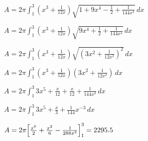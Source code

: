 \documentclass[../main.tex]{subfiles}
\begin{document}
\begin{enumerate}[itemsep=0.7cm]
    $A=2\pi \int_1^3 (x^3+\frac{1}{12x})\sqrt{1+9x^4-\frac{1}{2}+\frac{1}{144x^4}}\,dx$

    $A=2\pi \int_1^3 (x^3+\frac{1}{12x})\sqrt{9x^4+\frac{1}{2}+\frac{1}{144x^4}}\,dx$

    $A=2\pi \int_1^3 (x^3+\frac{1}{12x})\sqrt{(3x^2+\frac{1}{12x^2})^2}\,dx$

    $A=2\pi \int_1^3 (x^3+\frac{1}{12x})(3x^2+\frac{1}{12x^2})\,dx$

    $A=2\pi \int_1^3 3x^5 +\frac{x}{12}+\frac{x}{12}+\frac{1}{144x^3}\,dx$

    $A=2\pi \int_1^3 3x^5 +\frac{x}{3}+\frac{1}{144}x^{-3}\,dx$

    $A=2\pi\Bigl[\frac{x^6}{2}+\frac{x^2}{6}-\frac{1}{288x^2}\Bigr]_1^3=2295.5$

\end{enumerate}


\pagebreak
\end{document}
